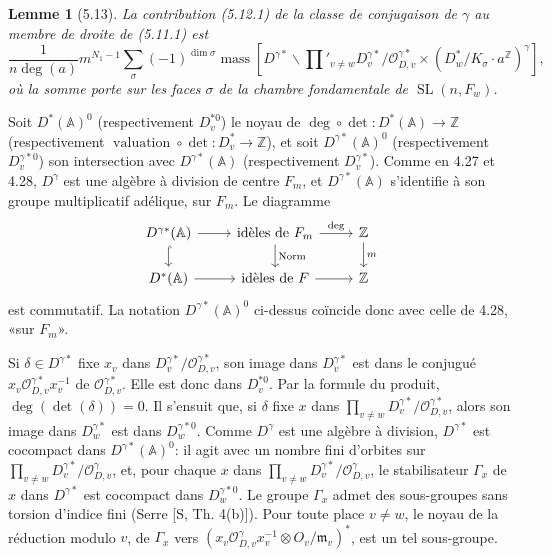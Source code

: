 \documentclass[10pt]{article}
\newcommand{\Z}{\mathbb Z}
\newcommand{\Adele}{\mathbb A}
\newcommand{\SL}{\operatorname{SL}}
\newcommand{\val}{\operatorname{valuation}}
\newcommand{\degm}{\operatorname{deg}}
\newcommand{\mass}{\operatorname{mass}}
\theoremstyle{deligne}
\newtheorem*{lemma*}{Lemme}
\newcommand{\heading}[1]{\vspace{0.7em}\noindent{\bfseries #1}\quad}
\begin{document}
\begin{lemma*}[5.13]
La contribution (5.12.1) de la classe de conjugaison de $\gamma$ au membre de droite de (5.11.1) est
\begin{equation}\tag{5.13.1}
\frac{1}{n\degm(a)}m^{N_1-1}\sum_\sigma(-1)^{\dim\sigma}
\mass\left[D^{\gamma *}\backslash \prod'_{v\ne w}D_v^{\gamma *}/\mathcal O_{D,v}^{\gamma *}\times(D_w^*/K_\sigma\cdot a^\Z)^\gamma\right],
\end{equation}
où la somme porte sur les faces $\sigma$ de la chambre fondamentale de $\SL(n,F_w)$.
\end{lemma*}

\heading{5.14.} Soit $D^*(\Adele)^0$ (respectivement $D_v^{*0}$) le noyau de $\degm\circ\det:D^*(\Adele)\to\Z$ (respectivement $\val\circ\det:D_v^*\to\Z$), et soit $D^{\gamma *}(\Adele)^0$ (respectivement $D_v^{\gamma *0}$) son intersection avec $D^{\gamma *}(\Adele)$ (respectivement $D_v^{\gamma *}$). Comme en 4.27 et 4.28, $D^\gamma$ est une algèbre à division de centre $F_m$, et $D^{\gamma *}(\Adele)$ s'identifie à son groupe multiplicatif adélique, sur $F_m$. Le diagramme
\[
\begin{tikzcd}[column sep=2.4em,row sep=1.5em]
D^{\gamma *}(\Adele) \arrow[r] \arrow[d,hook] & \hbox{id\`eles de }F_m \arrow[r,"\degm"] \arrow[d,"\mathrm{Norm}"] & \Z \arrow[d,"m"]\\
D^*(\Adele) \arrow[r] & \hbox{id\`eles de }F \arrow[r] & \Z
\end{tikzcd}
\]
est commutatif. La notation $D^{\gamma *}(\Adele)^0$ ci-dessus coïncide donc avec celle de 4.28, «sur $F_m$».

Si $\delta\in D^{\gamma *}$ fixe $x_v$ dans $D_v^{\gamma *}/\mathcal O_{D,v}^{\gamma *}$, son image dans $D_v^{\gamma *}$ est dans le conjugué $x_v\mathcal O_{D,v}^{\gamma *}x_v^{-1}$ de $\mathcal O_{D,v}^{\gamma *}$. Elle est donc dans $D_v^{*0}$. Par la formule du produit, $\degm(\det(\delta))=0$. Il s'ensuit que, si $\delta$ fixe $x$ dans $\prod_{v\ne w}D_v^{\gamma *}/\mathcal O_{D,v}^{\gamma *}$, alors son image dans $D_w^{\gamma *}$ est dans $D_w^{\gamma *0}$. Comme $D^\gamma$ est une algèbre à division, $D^{\gamma *}$ est cocompact dans $D^{\gamma *}(\Adele)^0$: il agit avec un nombre fini d'orbites sur $\prod_{v\ne w}D_v^{\gamma *}/\mathcal O_{D,v}^\gamma$, et, pour chaque $x$ dans $\prod_{v\ne w}D_v^{\gamma *}/\mathcal O_{D,v}^\gamma$, le stabilisateur $\Gamma_x$ de $x$ dans $D^{\gamma *}$ est cocompact dans $D_w^{\gamma *0}$. Le groupe $\Gamma_x$ admet des sous-groupes sans torsion d'indice fini (Serre [S, Th. 4(b)]). Pour toute place $v\ne w$, le noyau de la réduction modulo $v$, de $\Gamma_x$ vers $(x_v\mathcal O_{D,v}^{\gamma} x_v^{-1}\otimes O_v/\mathfrak m_v)^*$, est un tel sous-groupe.
\end{document}
